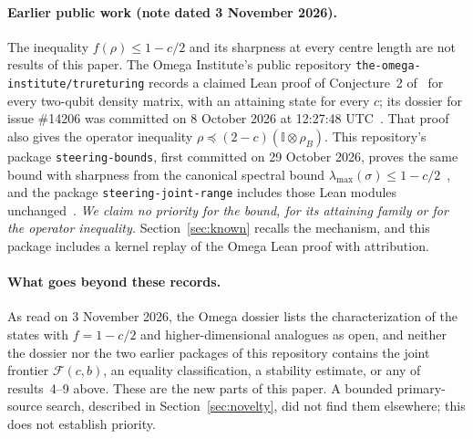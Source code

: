 \documentclass[11pt,a4paper]{article}
\theoremstyle{remark}\newtheorem{remark}[theorem]{Remark}
\newcommand{\Id}{\mathbb I}\newcommand{\HH}{\mathcal H}
\newcommand{\Fe}{\mathcal F}
\begin{document}
\paragraph{Earlier public work (note dated 3 November 2026).}
The inequality $f(\rho)\le1-c/2$ and its sharpness at every centre length are
not results of this paper. The Omega Institute's public repository
\texttt{the-omega-institute/trureturing} records a claimed Lean proof of
Conjecture~2 of~\cite{milne2014} for every two-qubit density matrix, with an
attaining state for every $c$; its dossier for issue \#14206 was committed on
8 October 2026 at 12:27:48 UTC~\cite{publicproof}. That proof also gives the
operator inequality $\rho\preceq(2-c)(\Id\otimes\rho_B)$. This repository's
package \texttt{steering-bounds}, first committed on 29 October 2026, proves
the same bound with sharpness from the canonical spectral bound
$\lambda_{\max}(\sigma)\le1-c/2$~\cite{steeringbounds}, and the package
\texttt{steering-joint-range} includes those Lean modules
unchanged~\cite{jointrange}. \emph{We claim no priority for the bound, for its
attaining family or for the operator inequality.} Section~\ref{sec:known}
recalls the mechanism, and this package includes a kernel replay of the Omega
Lean proof with attribution.

\paragraph{What goes beyond these records.}
As read on 3 November 2026, the Omega dossier lists the characterization of
the states with $f=1-c/2$ and higher-dimensional analogues as open, and
neither the dossier nor the two earlier packages of this repository
contains the joint frontier $\Fe(c,b)$, an equality classification, a
stability estimate, or any of results~4--9 above. These are the new parts
of this paper. A bounded primary-source search, described in
Section~\ref{sec:novelty}, did not find them elsewhere; this does not
establish priority.
\end{document}
